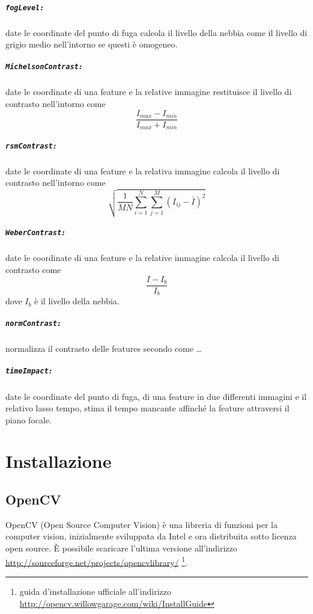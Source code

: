 \documentclass[12pt]{report}
\begin{document}
\paragraph*{\verb_fogLevel:_} date le coordinate del punto di fuga calcola il livello della nebbia come il livello di grigio medio nell'intorno se questi \`e omogeneo.

\paragraph*{\verb_MichelsonContrast:_} date le coordinate di una feature e la relative immagine restituisce il livello di contrasto nell'intorno come $$\frac{I_{max}-I_{min}}{I_{max}+I_{min}}$$

\paragraph*{\verb_rsmContrast:_} date le coordinate di una feature e la relativa immagine calcola il livello di contrasto nell'intorno come $$\sqrt{\frac{1}{MN}\sum_{i=1}^N\sum_{j=1}^M(I_{ij}-\bar{I})^2}$$

\paragraph*{\verb_WeberContrast:_} date le coordinate di una feature e la relative immagine calcola il livello di contrasto come $$\frac{I-I_b}{I_b}$$ dove $I_b$ \`e il livello della nebbia.

\paragraph*{\verb_normContrast:_} normalizza il contrasto delle features secondo come \dots

\paragraph*{\verb_timeImpact:_} date le coordinate del punto di fuga, di una feature in due differenti immagini e il relativo lasso tempo, stima il tempo mancante affinch\'e la feature attraversi il piano focale. %

\chapter{Installazione}
\section{OpenCV}
OpenCV (Open Source Computer Vision) \`e una libreria di funzioni per la computer vision, inizialmente sviluppata da Intel e ora distribuita sotto licenza open source. \`E possibile scaricare l'ultima versione all'indirizzo \url{http://sourceforge.net/projects/opencvlibrary/} \footnote{guida d'installazione ufficiale all'indirizzo \url{http://opencv.willowgarage.com/wiki/InstallGuide}}.
\end{document}
